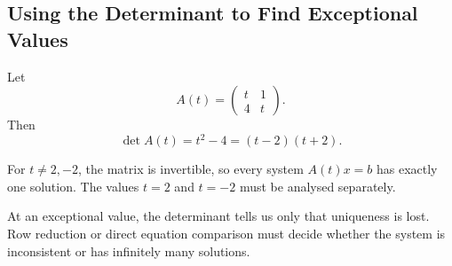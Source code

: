 \subsection{Using the Determinant to Find Exceptional Values}

Let
\[
A(t)=\begin{pmatrix}t&1\\4&t\end{pmatrix}.
\]
Then
\[
\det A(t)=t^2-4=(t-2)(t+2).
\]

\begin{corebox}
For $t\neq2,-2$, the matrix is invertible, so every system $A(t)x=b$ has exactly one solution. The values $t=2$ and $t=-2$ must be analysed separately.
\end{corebox}

At an exceptional value, the determinant tells us only that uniqueness is lost. Row reduction or direct equation comparison must decide whether the system is inconsistent or has infinitely many solutions.
